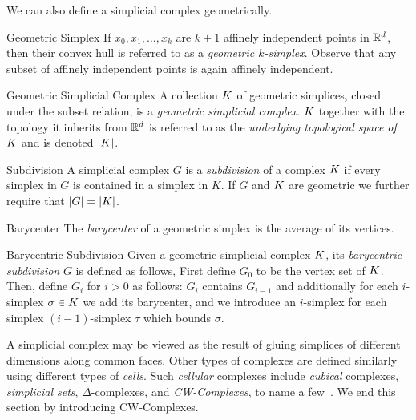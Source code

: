 We can also define a simplicial complex geometrically. 
\begin{definition}{Geometric Simplex}
If $x_0, x_1, \ldots, x_k$ are $k+1$ affinely independent points in $\mathbb{R}^d$, then their convex hull is referred to as a \emph{geometric $k$-simplex}. Observe that any subset of affinely independent points is again affinely independent. 
\end{definition}
\begin{definition}{Geometric Simplicial Complex}
A collection $K$ of geometric simplices, closed under the subset relation, is a \emph{geometric simplicial complex}. $K$ together with the topology it inherits from $\mathbb{R}^d$ is referred to as the \emph{underlying topological space of $K$} and is denoted $|K|$. 
\end{definition}
\begin{definition}{Subdivision}
A simplicial complex $G$ is a \emph{subdivision} of a complex $K$ if every simplex in $G$ is contained in a simplex in $K$. If $G$ and $K$ are geometric we further require that $|G| = |K|$.
\end{definition}
\begin{definition}{Barycenter}
The \emph{barycenter} of a geometric simplex is the average of its vertices.
\end{definition}
\begin{definition}{Barycentric Subdivision}
Given a geometric simplicial complex $K$, its \emph{barycentric subdivision} $G$ is defined as follows, First define $G_0$ to be the vertex set of $K$. Then, define $G_i$ for $i > 0$ as follows: $G_i$ contains $G_{i-1}$ and additionally for each $i$-simplex $\sigma  \in K$ we add its barycenter, and we introduce an $i$-simplex for each simplex $(i-1)$-simplex $\tau$ which bounds $\sigma$.
\end{definition}

A simplicial complex may be viewed as the result of gluing simplices of 
different dimensions along common faces. Other types of complexes are defined 
similarly using different types of \emph{cells}. Such \emph{cellular} complexes include \emph{cubical} complexes, \emph{simplicial sets}, $\Delta$-complexes, and \emph{CW-Complexes}, 
to name a few~\cite{ez-ssc-50,hatcher,kmm-ch-04,m-soat-68}. We end this section by introducing CW-Complexes.

